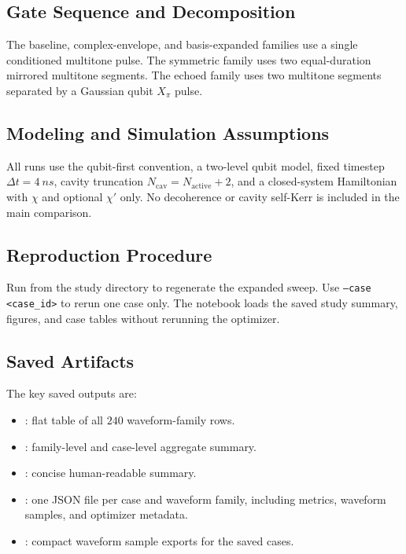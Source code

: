 \documentclass[aps,pra,twocolumn,reprint,floatfix,amsmath,amssymb]{revtex4-2}
\begin{document}
\subsection{Gate Sequence and Decomposition}
The baseline, complex-envelope, and basis-expanded families use a single conditioned multitone pulse. The symmetric family uses two equal-duration mirrored multitone segments. The echoed family uses two multitone segments separated by a Gaussian qubit $X_\pi$ pulse.

\subsection{Modeling and Simulation Assumptions}
All runs use the qubit-first convention, a two-level qubit model, fixed timestep $\Delta t = \SI{4}{ns}$, cavity truncation $N_{\mathrm{cav}} = N_{\mathrm{active}} + 2$, and a closed-system Hamiltonian with $\chi$ and optional $\chi'$ only. No decoherence or cavity self-Kerr is included in the main comparison.

\subsection{Reproduction Procedure}
Run  from the study  directory to regenerate the expanded sweep. Use \texttt{--case <case\_id>} to rerun one case only. The notebook  loads the saved study summary, figures, and case tables without rerunning the optimizer.

\subsection{Saved Artifacts}
The key saved outputs are:
\begin{itemize}
    \item {}: flat table of all $240$ waveform-family rows.
    \item {}: family-level and case-level aggregate summary.
    \item {}: concise human-readable summary.
    \item {}: one JSON file per case and waveform family, including metrics, waveform samples, and optimizer metadata.
    \item {}: compact waveform sample exports for the saved cases.
\end{itemize}
\end{document}
